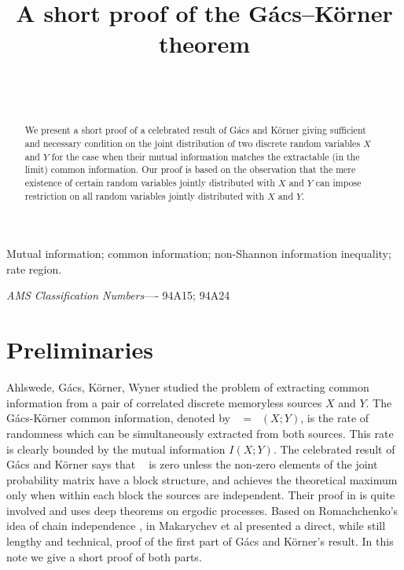 \documentclass{IEEEtran}
\title{\huge\bf A short proof of the G\'acs--K\"orner theorem}
\author{\IEEEauthorblockN{Laszlo Csirmaz}\\
\IEEEauthorblockA{R\'enyi Institute, Budapest and UTIA,
Prague}\\
\IEEEauthorblockA{email: csirmaz@renyi.hu}}
\DeclareMathOperator\GK{C_{\mathsf{GK}}}
\newcommand\I{I\xspace}
\begin{document}
\maketitle
\begin{abstract}
We present a short proof of a celebrated result of G\'acs and K\"orner
giving sufficient and necessary condition on the joint distribution of two
discrete random variables $X$ and $Y$ for the case when their mutual information
matches the extractable (in the limit) common information. Our proof is
based on the observation that the mere existence of certain random variables
jointly distributed with $X$ and $Y$ can impose restriction on all random
variables jointly distributed with $X$ and $Y$.
\end{abstract}

\begin{IEEEkeywords}
Mutual information; common information; non-Shannon
information inequality; rate region.

\textit{AMS Classification Numbers}----%
94A15; 94A24
\end{IEEEkeywords}

\section{Preliminaries}\label{sec:intro}

Ahlswede, G\'acs, K\"orner, Wyner \cite{a-k,a-2,gacs-korner,wyner} studied
the problem of extracting common information from a pair of correlated
discrete memoryless sources $X$ and $Y$. The G\'acs-K\"orner common
information, denoted by $\GK=\GK(X;Y)$, is the rate of randomness which can
be simultaneously extracted from both sources. This rate is clearly bounded
by the mutual information $\I(X;Y)$. The celebrated result of G\'acs and
K\"orner says that $\GK$ is zero unless the non-zero elements of the joint
probability matrix have a block structure, and achieves the theoretical
maximum only when within each block the sources are independent. Their proof
in \cite{gacs-korner} is quite involved and uses deep theorems on ergodic
processes. Based on Romachchenko's idea of chain independence
\cite{Rom2000}, in \cite{MMchain} Makarychev et al presented a direct, while
still lengthy and technical, proof of the first part of G\'acs and
K\"orner's result. In this note we give a short proof of both parts.
\end{document}
